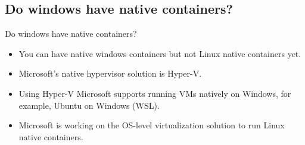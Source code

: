 \subsection{Do windows have native containers?}\label{subsec:windows-containers}
\begin{frame}{Do windows have native containers?}
    \begin{itemize}[<+- | alert@+>]
        \item You can have native windows containers but not Linux native containers yet.
        \item Microsoft's native hypervisor solution is Hyper-V\@.
        \item Using Hyper-V Microsoft supports running VMs natively on Windows, for example, Ubuntu on Windows (WSL).
        \item Microsoft is working on the OS-level virtualization solution to run Linux native containers.
    \end{itemize}
\end{frame}
